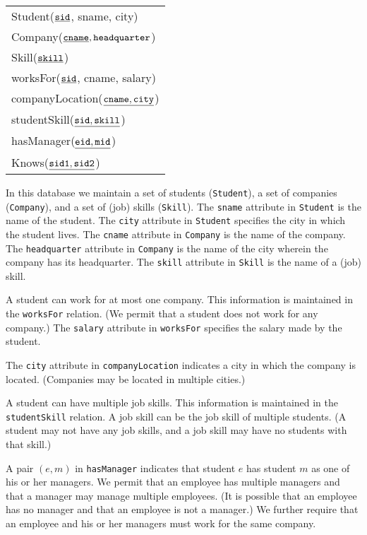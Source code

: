 \documentclass[11pt]{article}
\begin{document}
\begin{center}
{\tt
  \begin{tabular}{l}
  {Student}($\underline{\tt sid}$, sname, city) \\
  {Company}($\underline{\tt cname}, {\tt headquarter}$) \\
  {Skill}($\underline{\tt skill}$) \\
  {worksFor}($\underline{\tt sid}$, cname, salary) \\
  {companyLocation}($\underline{\tt cname, city}$) \\
  {studentSkill}($\underline{\tt sid, skill}$) \\
  {hasManager}($\underline{\tt eid, mid}$) \\
  {Knows}($\underline{\tt sid1, sid2}$) \\
   \end{tabular}
  }
\end{center}

In this database we maintain a set of students ({\tt Student}), a set
of companies ({\tt Company}), and a set of (job) skills ({\tt Skill}).  
The {\tt sname} attribute in {\tt Student} is the name of the student.  
The {\tt city} attribute in {\tt Student} specifies the city in which the student lives.  
The {\tt cname} attribute in {\tt Company} is the name of the company.
The {\tt headquarter} attribute in {\tt Company} is the name of the city wherein the company has its headquarter.
The {\tt skill} attribute in {\tt Skill} is the name of a (job) skill.

A student can work for at most one company. This information is maintained in the {\tt worksFor} relation. (We permit that a student does not work for any company.)
The {\tt salary} attribute in {\tt worksFor} specifies the salary made by the student.

The {\tt city} attribute in {\tt companyLocation} indicates a city in which the company is located.
(Companies may be located in multiple cities.)

A student can have multiple job skills. This information is maintained in the {\tt studentSkill} relation.  A job skill can be
the job skill of multiple students.  (A student may not have any job skills, and a job skill may
have no students with that skill.)

A pair $(e,m)$ in {\tt hasManager} indicates that student $e$ has  
student $m$ as one of his or her managers.
We permit that an employee has multiple managers and that a manager  may manage
multiple employees.  (It is possible that an employee has no manager
and that an employee is not a manager.)
We further require that 
an employee and his or her managers must work for the
same company.
\end{document}
